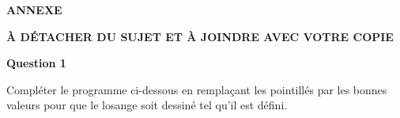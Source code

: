 \vspace{0.5cm}

\begin{center}\textbf{\large ANNEXE}

\vspace{1cm} 

\textbf{À DÉTACHER DU SUJET ET À JOINDRE AVEC VOTRE COPIE }
\end{center}

\vspace{1cm}



\bigskip

\textbf{Question 1 }

\medskip

Compléter le programme ci-dessous en remplaçant les pointillés par les bonnes valeurs pour que le losange soit dessiné tel qu'il est défini. 

\begin{center}
\parbox{0.4\linewidth}{
\begin{scratch}
\end{scratch}
}\hfill
\parbox{0.4\linewidth}{
\begin{scratch}
{
}
\end{scratch}
}
\end{center}


